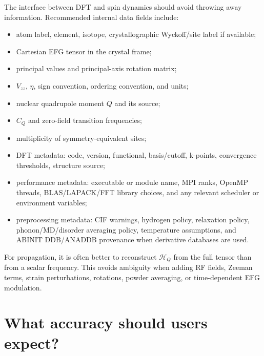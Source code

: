 \documentclass[11pt]{article}
\newcommand{\CQ}{C_Q}
\newcommand{\Vzz}{V_{zz}}
\newcommand{\etaEFG}{\eta}
\begin{document}
The interface between DFT and spin dynamics should avoid throwing away information.  Recommended internal data fields include:
\begin{itemize}
\item atom label, element, isotope, crystallographic Wyckoff/site label if available;
\item Cartesian EFG tensor in the crystal frame;
\item principal values and principal-axis rotation matrix;
\item $\Vzz$, $\etaEFG$, sign convention, ordering convention, and units;
\item nuclear quadrupole moment $Q$ and its source;
\item $\CQ$ and zero-field transition frequencies;
\item multiplicity of symmetry-equivalent sites;
\item DFT metadata: code, version, functional, basis/cutoff, k-points, convergence thresholds, structure source;
\item performance metadata: executable or module name, MPI ranks, OpenMP threads, BLAS/LAPACK/FFT library choices, and any relevant scheduler or environment variables;
\item preprocessing metadata: CIF warnings, hydrogen policy, relaxation policy, phonon/MD/disorder averaging policy, temperature assumptions, and ABINIT DDB/ANADDB provenance when derivative databases are used.
\end{itemize}

For propagation, it is often better to reconstruct $\mathcal H_Q$ from the full tensor than from a scalar frequency.  This avoids ambiguity when adding RF fields, Zeeman terms, strain perturbations, rotations, powder averaging, or time-dependent EFG modulation.

\section{What accuracy should users expect?}
\end{document}
